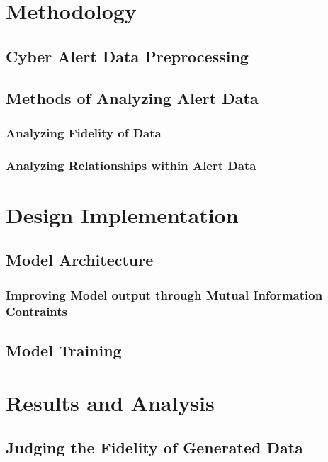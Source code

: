 \documentclass[12pt,american]{report}
\begin{document}
\chapter{Methodology}

\section{Cyber Alert Data Preprocessing}

\section{Methods of Analyzing Alert Data}

\subsection{Analyzing Fidelity of Data}

\subsection{Analyzing Relationships within Alert Data}

\chapter{Design Implementation}

\section{Model Architecture}

\subsection{Improving Model output through Mutual Information Contraints}

\section{Model Training}

\chapter{Results and Analysis}

\section{Judging the Fidelity of Generated Data}
\end{document}
